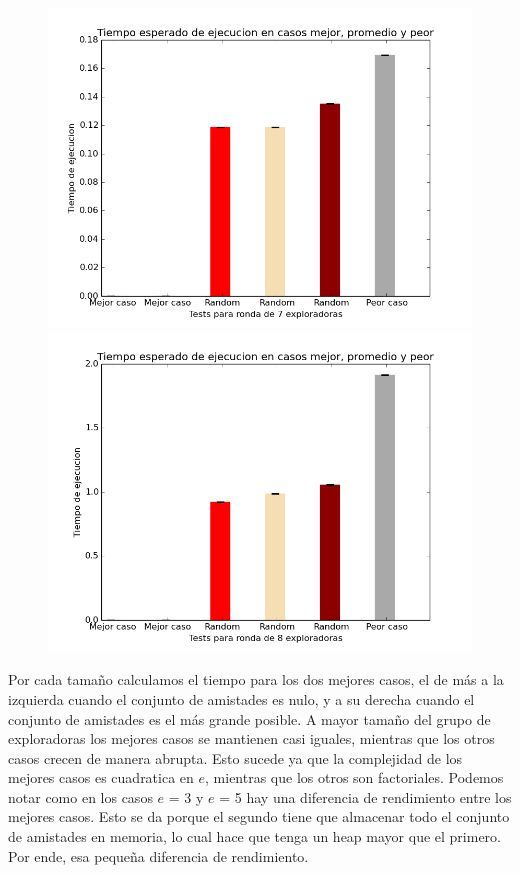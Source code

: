 \documentclass[11pt]{article}
\begin{document}
      \begin{figure}[H]
        \includegraphics[scale=0.4]{tiemposE7}
        \includegraphics[scale=0.4]{tiemposE8}
      \end{figure}

Por cada tamaño calculamos el tiempo para los dos mejores casos, el de más a la izquierda cuando el conjunto de amistades es 
nulo, y a su derecha cuando el conjunto de amistades es el más grande posible. A mayor tamaño del grupo de exploradoras los mejores casos 
se mantienen casi iguales, mientras que los otros casos crecen de manera abrupta. Esto sucede ya que la complejidad de los mejores casos es 
cuadratica en $e$, mientras que los otros son factoriales. Podemos notar como en los casos $e$ = 3 y $e$ = 5 hay una diferencia de rendimiento entre los 
mejores casos. Esto se da porque el segundo tiene que almacenar todo el conjunto de amistades en memoria, lo cual hace que tenga un heap mayor 
que el primero. Por ende, esa pequeña diferencia de rendimiento.
\end{document}
